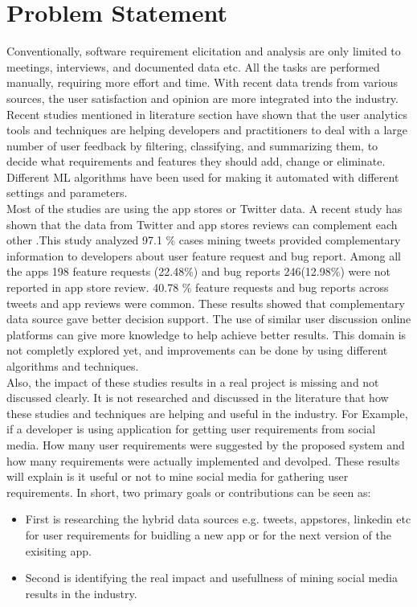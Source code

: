 \section{Problem Statement}
Conventionally, software requirement elicitation and analysis are only limited to meetings,
interviews, and documented data etc. All the tasks are performed manually, requiring more
effort and time. With recent data trends from various sources, the user satisfaction and opinion
are more integrated into the industry. Recent studies mentioned in literature section have shown that the user analytics tools
and techniques are helping developers and practitioners to deal with a large number of user
feedback by filtering, classifying, and summarizing them, to decide what requirements and
features they should add, change or eliminate. Different ML algorithms have been used for
making it automated with different settings and parameters.\\

	 Most of the studies are using the app stores or Twitter data. A recent study has shown that the data from Twitter and app
stores reviews can complement each other \cite{Nayebi}.This study analyzed  97.1 \% cases mining tweets provided complementary information to developers about user 
feature request and bug report. Among all the apps 198 feature requests (22.48\%) and bug reports 246(12.98\%) were not reported in app store review. 
40.78 \% feature requests and bug reports across tweets and app reviews were common. These results showed that complementary data source 
gave better decision support. The use of
similar user discussion online platforms can give more knowledge to help achieve better results. 
This domain is not completly explored yet, and improvements can be done by using different
algorithms and techniques. \\

Also, the impact of these studies results in a real project is missing and
not discussed clearly. It is not researched and discussed in the literature that how these studies and techniques are helping and useful in the industry. For Example, if a developer is using application for getting user requirements from social media. How many user requirements were suggested by the proposed system and how many requirements were actually implemented and devolped. These results will explain is it useful or not to mine social media for gathering user requirements. In short, two primary goals or contributions can be seen as:\\
\begin{itemize}
  \item First is researching the hybrid data sources e.g. tweets, appstores, linkedin etc for user requirements for buidling a new app or for the next version of the exisiting app.
  \item Second is identifying the real impact and usefullness of mining social media results in the industry.
\end{itemize}

